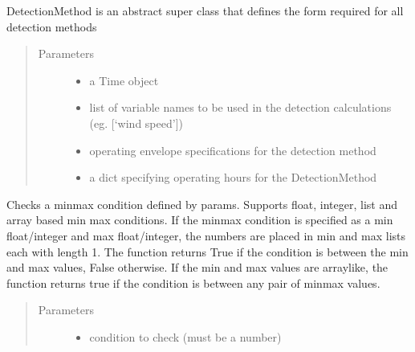 \documentclass[letterpaper,10pt,english]{sphinxmanual}
\begin{document}
\begin{fulllineitems}
\label{\detokenize{index:feast.DetectionModules.abstract_detection_method.DetectionMethod}}
DetectionMethod is an abstract super class that defines the form required for all detection methods
\begin{quote}\begin{description}
\item[{Parameters}] \leavevmode\begin{itemize}
\item {} 
 \textendash{} a Time object

\item {} 
 \textendash{} list of variable names to be used in the detection calculations (eg. {[}‘wind speed’{]})

\item {} 
 \textendash{} operating envelope specifications for the detection method

\item {} 
 \textendash{} a dict specifying operating hours for the DetectionMethod

\end{itemize}

\end{description}\end{quote}

\begin{fulllineitems}
\label{\detokenize{index:feast.DetectionModules.abstract_detection_method.DetectionMethod.check_min_max_condition}}
Checks a min\sphinxhyphen{}max condition defined by params. Supports float, integer, list and array based min max conditions.
If the min\sphinxhyphen{}max condition is specified as a min float/integer and max float/integer, the numbers are placed in
min and max lists each with length 1. The function returns True if the condition is between the min and max
values, False otherwise. If the min and max values are array\sphinxhyphen{}like, the function returns true if the condition is
between any pair of min\sphinxhyphen{}max values.
\begin{quote}\begin{description}
\item[{Parameters}] \leavevmode\begin{itemize}
\item {} 
 \textendash{} condition to check (must be a number)


\end{itemize}
\end{description}
\end{quote}
\end{fulllineitems}
\end{fulllineitems}
\end{document}
